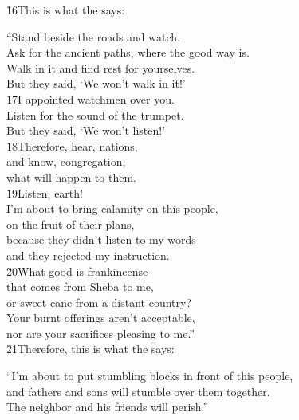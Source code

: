 
\v{16}This is what the  says:

\begin{poetry}
\poeml ``Stand beside the roads and watch. \\
\poemll    Ask for the ancient paths, where the good way is. \\
\poeml Walk in it and find rest for yourselves. \\
\poemll    But they said, `We won't walk in it!' \\
\poeml \v{17}I appointed watchmen over you. \\
\poemll    Listen for the sound of the trumpet. \\
\poeml But they said, `We won't listen!' \\
\poeml \v{18}Therefore, hear, nations, \\
\poemll    and know, congregation, \\
\poemlll       what will happen to them. \\
\poeml \v{19}Listen, earth! \\
\poemll    I'm about to bring calamity on this people, \\
\poemlll       on the fruit of their plans, \\
\poeml because they didn't listen to my words \\
\poemll    and they rejected my instruction. \\
\poeml \v{20}What good is frankincense \\
\poemll    that comes from Sheba to me, \\
\poemlll       or sweet cane from a distant country? \\
\poeml Your burnt offerings aren't acceptable, \\
\poemll    nor are your sacrifices pleasing to me.'' \\
\poeml \v{21}Therefore, this is what the  says:
\end{poetry}

\begin{poetry}
\poeml ``I'm about to put stumbling blocks in front of this people, \\
\poemll    and fathers and sons will stumble over them together. \\
\poemlll       The neighbor and his friends will perish.''
\end{poetry}

